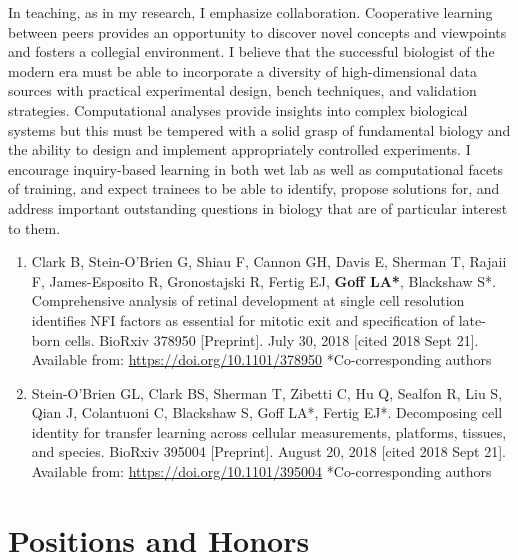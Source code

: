 \documentclass{nihbiosketch}
\begin{document}
	In teaching, as in my research, I emphasize collaboration. Cooperative learning between peers provides an opportunity to discover novel concepts and viewpoints and fosters a collegial environment. I believe that the successful biologist of the modern era must be able to incorporate a diversity of high-dimensional data sources with practical experimental design, bench techniques, and validation strategies. Computational analyses provide insights into complex biological systems but this must be tempered with a solid grasp of fundamental biology and the ability to design and implement appropriately controlled experiments. I encourage inquiry-based learning in both wet lab as well as computational facets of training, and expect trainees to be able to identify, propose solutions for, and address important outstanding questions in biology that are of particular interest to them.

\begin{enumerate}
\item Clark B, Stein-O’Brien G, Shiau F, Cannon GH, Davis E, Sherman T, Rajaii F, James-Esposito R, Gronostajski R, Fertig EJ, \textbf{Goff LA*}, Blackshaw S*. Comprehensive analysis of retinal development at single cell resolution identifies NFI factors as essential for mitotic exit and specification of late-born cells. BioRxiv 378950 [Preprint]. July 30, 2018 [cited 2018 Sept 21]. Available from: \url{https://doi.org/10.1101/378950} *Co-corresponding authors

\item Stein-O’Brien GL, Clark BS, Sherman T, Zibetti C, Hu Q, Sealfon R, Liu S, Qian J, Colantuoni C, Blackshaw S, Goff LA*, Fertig EJ*. Decomposing cell identity for transfer learning across cellular measurements, platforms, tissues, and species. BioRxiv 395004 [Preprint]. August 20, 2018 [cited 2018 Sept 21]. Available from: \url{https://doi.org/10.1101/395004} *Co-corresponding authors

\end{enumerate}

\section{Positions and Honors}
\end{document}
